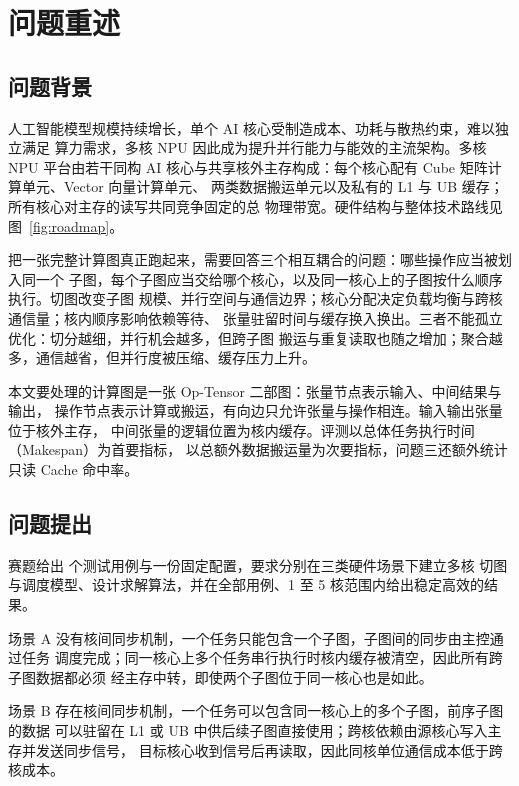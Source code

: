 \documentclass[bwprint]{gmcmthesis}
\begin{document}
\pagestyle{plain}

\maketoc
\clearpage

\section{问题重述}

\subsection{问题背景}

人工智能模型规模持续增长，单个 AI 核心受制造成本、功耗与散热约束，难以独立满足
算力需求，多核 NPU 因此成为提升并行能力与能效的主流架构。多核 NPU 平台由若干同构
AI 核心与共享核外主存构成：每个核心配有 Cube 矩阵计算单元、Vector 向量计算单元、
两类数据搬运单元以及私有的 L1 与 UB 缓存；所有核心对主存的读写共同竞争固定的总
物理带宽。硬件结构与整体技术路线见图~\ref{fig:roadmap}。

把一张完整计算图真正跑起来，需要回答三个相互耦合的问题：哪些操作应当被划入同一个
子图，每个子图应当交给哪个核心，以及同一核心上的子图按什么顺序执行。切图改变子图
规模、并行空间与通信边界；核心分配决定负载均衡与跨核通信量；核内顺序影响依赖等待、
张量驻留时间与缓存换入换出。三者不能孤立优化：切分越细，并行机会越多，但跨子图
搬运与重复读取也随之增加；聚合越多，通信越省，但并行度被压缩、缓存压力上升。

本文要处理的计算图是一张 Op-Tensor 二部图：张量节点表示输入、中间结果与输出，
操作节点表示计算或搬运，有向边只允许张量与操作相连。输入输出张量位于核外主存，
中间张量的逻辑位置为核内缓存。评测以总体任务执行时间（Makespan）为首要指标，
以总额外数据搬运量为次要指标，问题三还额外统计只读 Cache 命中率。

\subsection{问题提出}

赛题给出 \CaseCount 个测试用例与一份固定配置，要求分别在三类硬件场景下建立多核
切图与调度模型、设计求解算法，并在全部用例、1 至 5 核范围内给出稳定高效的结果。

场景 A 没有核间同步机制，一个任务只能包含一个子图，子图间的同步由主控通过任务
调度完成；同一核心上多个任务串行执行时核内缓存被清空，因此所有跨子图数据都必须
经主存中转，即使两个子图位于同一核心也是如此。

场景 B 存在核间同步机制，一个任务可以包含同一核心上的多个子图，前序子图的数据
可以驻留在 L1 或 UB 中供后续子图直接使用；跨核依赖由源核心写入主存并发送同步信号，
目标核心收到信号后再读取，因此同核单位通信成本低于跨核成本。
\end{document}
